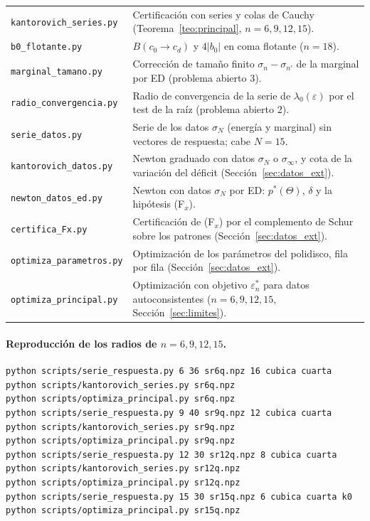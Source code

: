 \documentclass[11pt,a4paper]{article}
\theoremstyle{definition}
\theoremstyle{remark}
\newcommand{\eps}{\varepsilon}
\begin{document}
\begin{center}
\begin{tabular}{>{\raggedright}p{4.3cm}>{\raggedright\arraybackslash}p{10.2cm}}
\texttt{kantorovich\_series.py} & Certificación con series y colas de Cauchy (Teorema~\ref{teo:principal}, $n=6,9,12,15$).\\
\texttt{b0\_flotante.py} & $B(c_0\to c_d)$ y $4|b_0|$ en coma flotante ($n=18$).\\
\texttt{marginal\_tamano.py} & Corrección de tamaño finito $\sigma_n-\sigma_{n'}$ de la marginal por ED (problema abierto 3).\\
\texttt{radio\_convergencia.py} & Radio de convergencia de la serie de $\lambda_0(\eps)$ por el test de la raíz (problema abierto 2).\\
\texttt{serie\_datos.py} & Serie de los datos $\sigma_N$ (energía y marginal) sin vectores de respuesta; cabe $N=15$.\\
\texttt{kantorovich\_datos.py} & Newton graduado con datos $\sigma_N$ o $\sigma_\infty$, y cota de la variación del déficit (Sección~\ref{sec:datos_ext}).\\
\texttt{newton\_datos\_ed.py} & Newton con datos $\sigma_N$ por ED: $p^*(\Theta)$, $\delta$ y la hipótesis (F$_x$).\\
\texttt{certifica\_Fx.py} & Certificación de (F$_x$) por el complemento de Schur sobre los patrones (Sección~\ref{sec:datos_ext}).\\
\texttt{optimiza\_\allowbreak parametros.py} & Optimización de los parámetros del polidisco, fila por fila (Sección~\ref{sec:datos_ext}).\\
\texttt{optimiza\_\allowbreak principal.py} & Optimización con objetivo $\eps_n^*$ para datos autoconsistentes ($n=6,9,12,15$, Sección~\ref{sec:limites}).\\
\bottomrule
\end{tabular}
\end{center}

\paragraph{Reproducción de los radios de $n=6,9,12,15$.}
\begin{verbatim}
python scripts/serie_respuesta.py 6 36 sr6q.npz 16 cubica cuarta
python scripts/kantorovich_series.py sr6q.npz
python scripts/optimiza_principal.py sr6q.npz
python scripts/serie_respuesta.py 9 40 sr9q.npz 12 cubica cuarta
python scripts/kantorovich_series.py sr9q.npz
python scripts/optimiza_principal.py sr9q.npz
python scripts/serie_respuesta.py 12 30 sr12q.npz 8 cubica cuarta
python scripts/kantorovich_series.py sr12q.npz
python scripts/optimiza_principal.py sr12q.npz
python scripts/serie_respuesta.py 15 30 sr15q.npz 6 cubica cuarta k0
python scripts/optimiza_principal.py sr15q.npz
\end{verbatim}
\end{document}
